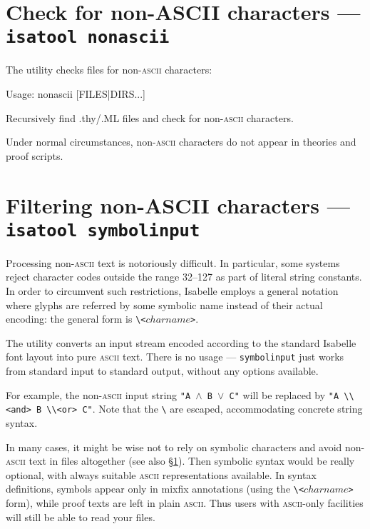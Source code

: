 \section{Check for non-ASCII characters --- \texttt{isatool nonascii}}
\label{sec:tool-nonascii}

The  utility checks files for non-\textsc{ascii} characters:
\begin{ttbox}
Usage: nonascii [FILES|DIRS...]

Recursively find .thy/.ML files and check for non-\textsc{ascii}
characters.
\end{ttbox}
Under normal circumstances, non-\textsc{ascii} characters do not appear in
theories and proof scripts.


\section{Filtering non-ASCII characters --- \texttt{isatool symbolinput}}
\label{sec:tool-symbolinput}

Processing non-\textsc{ascii} text is notoriously difficult.  In particular,
some {\ML} systems reject character codes outside the range 32--127 as part of
literal string constants. In order to circumvent such restrictions, Isabelle
employs a general notation where glyphs are referred by some symbolic name
instead of their actual encoding: the general form is
\verb|\<|$charname$\verb|>|.

The  utility converts an input stream encoded according to
the standard Isabelle font layout into pure \textsc{ascii} text. There is no
usage --- \texttt{symbolinput} just works from standard input to standard
output, without any options available.

\medskip For example, the non-\textsc{ascii} input string \texttt{"A $\land$ B
  $\lor$ C"} will be replaced by \verb|"A \\<and> B \\<or> C"|.  Note that the
\verb|\| are escaped, accommodating concrete {\ML} string syntax.

\medskip In many cases, it might be wise not to rely on symbolic characters
and avoid non-\textsc{ascii} text in files altogether (see also
\S\ref{sec:tool-nonascii}). Then symbolic syntax would be really optional,
with always suitable \textsc{ascii} representations available.  In syntax
definitions, symbols appear only in mixfix annotations (using the
\verb|\<|$charname$\verb|>| form), while proof texts are left in plain
\textsc{ascii}.  Thus users with \textsc{ascii}-only facilities will still be
able to read your files.


